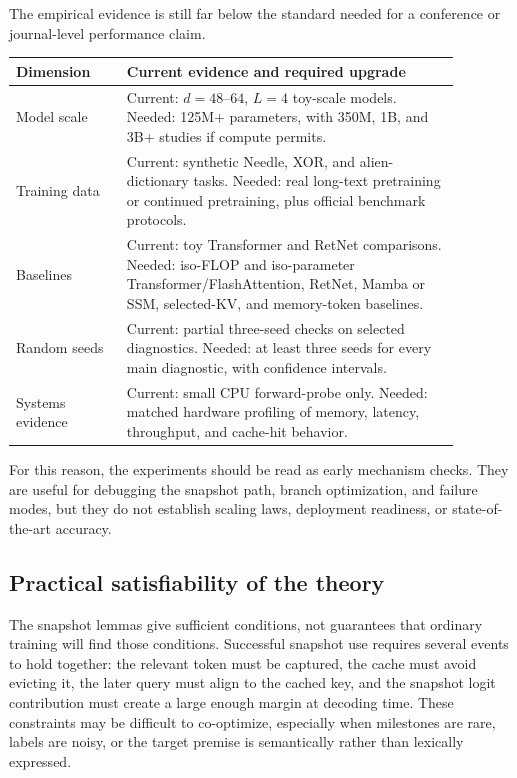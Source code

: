 \documentclass[11pt]{article}
\begin{document}
The empirical evidence is still far below the standard needed for a conference or journal-level performance claim.
\begin{center}
\begin{tabular}{p{0.22\linewidth}p{0.66\linewidth}}
\toprule
Dimension & Current evidence and required upgrade \\
\midrule
Model scale & Current: $d=48$--$64$, $L=4$ toy-scale models. Needed: 125M+ parameters, with 350M, 1B, and 3B+ studies if compute permits. \\
Training data & Current: synthetic Needle, XOR, and alien-dictionary tasks. Needed: real long-text pretraining or continued pretraining, plus official benchmark protocols. \\
Baselines & Current: toy Transformer and RetNet comparisons. Needed: iso-FLOP and iso-parameter Transformer/FlashAttention, RetNet, Mamba or SSM, selected-KV, and memory-token baselines. \\
Random seeds & Current: partial three-seed checks on selected diagnostics. Needed: at least three seeds for every main diagnostic, with confidence intervals. \\
Systems evidence & Current: small CPU forward-probe only. Needed: matched hardware profiling of memory, latency, throughput, and cache-hit behavior. \\
\bottomrule
\end{tabular}
\end{center}

For this reason, the experiments should be read as early mechanism checks. They are useful for debugging the snapshot path, branch optimization, and failure modes, but they do not establish scaling laws, deployment readiness, or state-of-the-art accuracy.

\subsection{Practical satisfiability of the theory}

The snapshot lemmas give sufficient conditions, not guarantees that ordinary training will find those conditions. Successful snapshot use requires several events to hold together: the relevant token must be captured, the cache must avoid evicting it, the later query must align to the cached key, and the snapshot logit contribution must create a large enough margin at decoding time. These constraints may be difficult to co-optimize, especially when milestones are rare, labels are noisy, or the target premise is semantically rather than lexically expressed.
\end{document}
